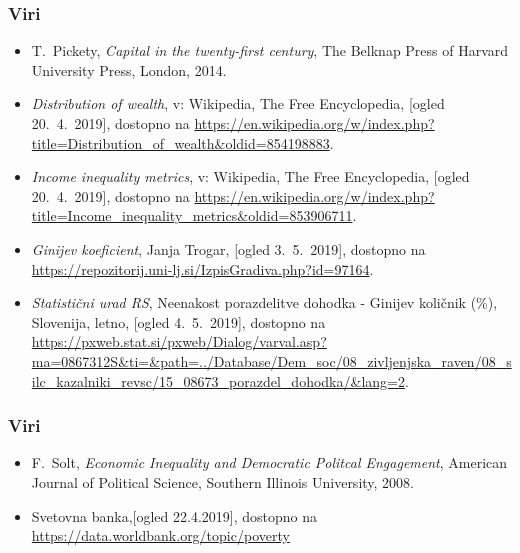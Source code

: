 \documentclass[10pt]{beamer}
\begin{document}
\begin{frame}
\frametitle{Viri}
	\begin{itemize}
		\item
			\label{Pickety}
			T.~Pickety, \emph{Capital in the twenty-first century}, The Belknap Press of 						Harvard University Press, London, 2014.

		\item 
			\label{Razdelitev premoženja}
			\emph{Distribution of wealth}, v: Wikipedia, The Free Encyclopedia, [ogled 							20.~4.~2019], dostopno na \url{https://en.wikipedia.org/w/index.php?								title=Distribution_of_wealth&oldid=854198883}.

		\item 
			\label{Metrike ekonomske neenakosti}
			\emph{Income inequality metrics}, v: Wikipedia, The Free Encyclopedia, [ogled 					20.~4.~2019], dostopno na \url{https://en.wikipedia.org/w/index.php?								title=Income_inequality_metrics&oldid=853906711}.

\item
\emph{Ginijev koeficient}, Janja Trogar, [ogled 3.~5.~2019], dostopno na \url{https://repozitorij.uni-lj.si/IzpisGradiva.php?id=97164}.

\item
\emph{Statistični urad RS}, Neenakost porazdelitve dohodka - Ginijev količnik (\%), Slovenija, letno, [ogled 4.~5.~2019], dostopno na \url{https://pxweb.stat.si/pxweb/Dialog/varval.asp?ma=0867312S&ti=&path=../Database/Dem_soc/08_zivljenjska_raven/08_silc_kazalniki_revsc/15_08673_porazdel_dohodka/&lang=2}.


\end{itemize}
\end {frame}

\begin{frame}
\frametitle{Viri}
\begin{itemize}
\item
F.~Solt, \emph{Economic Inequality and Democratic Politcal Engagement}, American Journal of Political Science, Southern Illinois University, 2008.		
\item{Svetovna banka},[ogled 22.4.2019], dostopno na \url{https://data.worldbank.org/topic/poverty}	
	

\end{itemize}
\end{frame}
\end{document}
